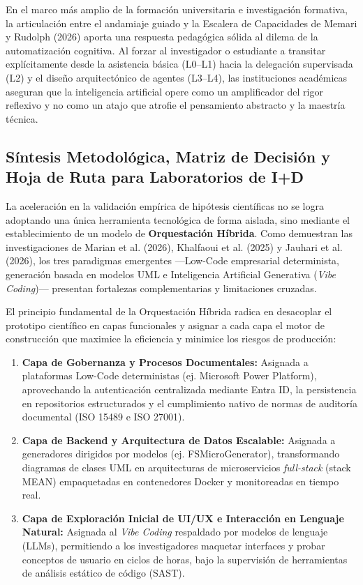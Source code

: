 En el marco más amplio de la formación universitaria e investigación formativa, la articulación entre el andamiaje guiado y la Escalera de Capacidades de Memari y Rudolph (2026) aporta una respuesta pedagógica sólida al dilema de la automatización cognitiva. Al forzar al investigador o estudiante a transitar explícitamente desde la asistencia básica (L0--L1) hacia la delegación supervisada (L2) y el diseño arquitectónico de agentes (L3--L4), las instituciones académicas aseguran que la inteligencia artificial opere como un amplificador del rigor reflexivo y no como un atajo que atrofie el pensamiento abstracto y la maestría técnica.
\subsection{Síntesis Metodológica, Matriz de Decisión y Hoja de Ruta para Laboratorios de I+D}

La aceleración en la validación empírica de hipótesis científicas no se logra adoptando una única herramienta tecnológica de forma aislada, sino mediante el establecimiento de un modelo de \textbf{Orquestación Híbrida}. Como demuestran las investigaciones de Marian et al. (2026), Khalfaoui et al. (2025) y Jauhari et al. (2026), los tres paradigmas emergentes ---Low-Code empresarial determinista, generación basada en modelos UML e Inteligencia Artificial Generativa (\textit{Vibe Coding})--- presentan fortalezas complementarias y limitaciones cruzadas.

El principio fundamental de la Orquestación Híbrida radica en desacoplar el prototipo científico en capas funcionales y asignar a cada capa el motor de construcción que maximice la eficiencia y minimice los riesgos de producción:

\begin{enumerate}
    \item \textbf{Capa de Gobernanza y Procesos Documentales:} Asignada a plataformas Low-Code deterministas (ej. Microsoft Power Platform), aprovechando la autenticación centralizada mediante Entra ID, la persistencia en repositorios estructurados y el cumplimiento nativo de normas de auditoría documental (ISO 15489 e ISO 27001).
    \item \textbf{Capa de Backend y Arquitectura de Datos Escalable:} Asignada a generadores dirigidos por modelos (ej. FSMicroGenerator), transformando diagramas de clases UML en arquitecturas de microservicios \textit{full-stack} (stack MEAN) empaquetadas en contenedores Docker y monitoreadas en tiempo real.
    \item \textbf{Capa de Exploración Inicial de UI/UX e Interacción en Lenguaje Natural:} Asignada al \textit{Vibe Coding} respaldado por modelos de lenguaje (LLMs), permitiendo a los investigadores maquetar interfaces y probar conceptos de usuario en ciclos de horas, bajo la supervisión de herramientas de análisis estático de código (SAST).
\end{enumerate}

